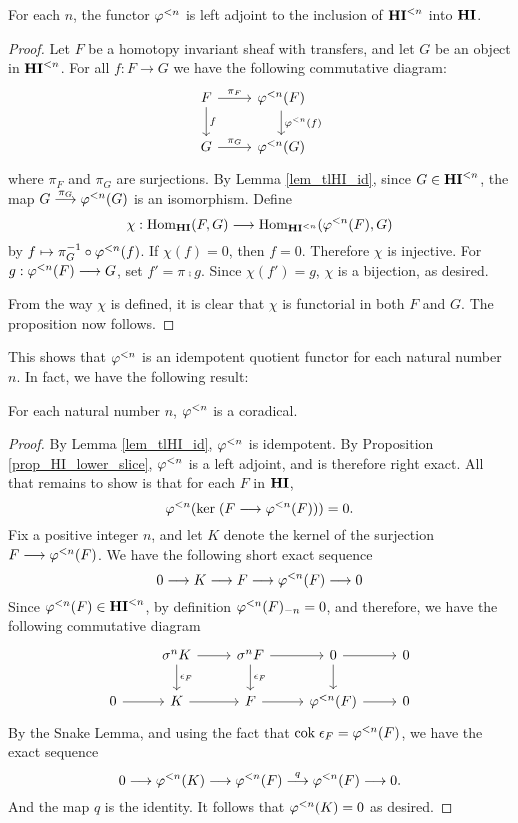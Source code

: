 \begin{prop}\label{prop_HI_lower_slice}
For each $n$, the functor $\tlHI{n}$ is left adjoint to the 
inclusion of $\TLHI{n}{\HI}$ into $\HI$.
\end{prop}
\begin{proof}
Let $F$ be a homotopy invariant sheaf with transfers, and let $G$ 
be an object in $\TLHI{n}{\HI}$. For all $f: F \to G$ we have the 
following commutative diagram:
\[
\begin{tikzcd}
F \arrow{r}{\pi_F} \arrow{d}{f}
& \tlHI{n}(F) \arrow{d}{\tlHI{n}(f)} \\
G \arrow{r}{\pi_G}
& \tlHI{n}(G) 
\end{tikzcd}
\]
where $\pi_F$ and $\pi_G$ are surjections. By Lemma 
\ref{lem_tlHI_id}, since $G \in \TLHI{n}{\HI}$, the map $G 
\stackrel{\pi_G}{\to} \tlHI{n}(G)$ is an isomorphism. Define
\[
\chi : \homHI(F, G) \to \hom_{\TLHI{n}{\HI}}(\tlHI{n}(F), G)
\]
by $f \mapsto \pi_G^{-1} \circ \tlHI{n}(f)$. If $\chi(f) = 0$, 
then $f = 0$. Therefore $\chi$ is injective. For $g: \tlHI{n}(F) 
\to G$, set $f' = \pi \comp g$. Since $\chi(f') = g$, $\chi$ is a 
bijection, as desired.

From the way $\chi$ is defined, it is clear that $\chi$ is 
functorial in both $F$ and $G$. The proposition now follows.
\end{proof}

This shows that $\tlHI{n}$ is an idempotent quotient functor
for each natural number $n$. In fact, we have the following 
result:

\begin{prop}\label{prop_tlHIn_corad}
For each natural number $n$, $\tlHI{n}$ is a coradical.
\end{prop}
\begin{proof}
By Lemma \ref{lem_tlHI_id}, $\tlHI{n}$ is idempotent. By Proposition
\ref{prop_HI_lower_slice}, $\tlHI{n}$ is a left adjoint, and
is therefore right exact. All that remains to show is that for
each $F$ in $\HI$,
\[
\tlHI{n}(\ker (F \to \tlHI{n}(F))) = 0.
\]
Fix a positive integer $n$, and let $K$ denote the kernel of the 
surjection $F \to \tlHI{n}(F)$. We have the following short exact 
sequence 
\[
0 \to K \to F \to \tlHI{n}(F) \to 0
\]
Since $\tlHI{n}(F) \in \TLHI{n}{\HI}$, by definition 
$\RHI[n]{\tlHI{n}(F)} = 0$, and therefore, we have the following
commutative diagram
\[
\begin{tikzcd}
{} &\sgHI{n} K \arrow{d}{\cuHI_F} \arrow{r}
   &\sgHI{n} F \arrow{d}{\cuHI_F} \arrow{r}
   &0 \arrow{d} \arrow{r}
   &0 \\
0 \arrow{r} &
  K \arrow{r}&
  F \arrow{r}&
  \tlHI{n}(F) \arrow{r}&
  0
\end{tikzcd}
\]
By the Snake Lemma, and using the fact that $\cok \cuHI_F = 
\tlHI{n}(F)$, we have the exact sequence
\[
0 \to \tlHI{n}(K) \to \tlHI{n}(F) \stackrel{q}{\to} \tlHI{n}(F) 
   \to 0.
\]
And the map $q$ is the identity. It follows that $\tlHI{n}(K) = 0$ 
as desired.
\end{proof}

